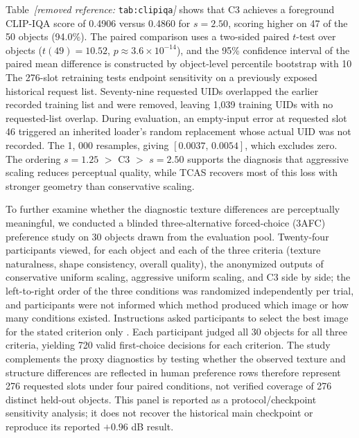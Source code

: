 \documentclass[times,twocolumn,final]{elsarticle}
\providecommand{\DIFadd}[1]{{\protect\color{blue} \sf #1}} %
\providecommand{\DIFdel}[1]{{\protect\color{red} \scriptsize #1}} %
\providecommand{\DIFaddbegin}{} %
\providecommand{\DIFaddend}{} %
\providecommand{\DIFdelbegin}{} %
\providecommand{\DIFdelend}{} %
\begin{document}
\DIFdelbegin \DIFdel{Table~\textit{[removed reference: }\texttt{tab:clipiqa}\textit{]} shows that C3 achieves a foreground CLIP-IQA score of 0.4906 versus 0.4860 for $s = 2.50$, scoring higher on 47 of the 50 objects (94.0\%). The paired comparison uses a two-sided paired $t$-test over objects ($t(49)=10.52$, $p\approx3.6\times10^{-14}$), and the 95\% confidence interval of the paired mean difference is constructed by object-level percentile bootstrap with 10}%
\DIFdelend \DIFaddbegin \DIFadd{The 276-slot retraining tests endpoint sensitivity on a previously exposed historical request list. Seventy-nine requested UIDs overlapped the earlier recorded training list and were removed, leaving 1,039 training UIDs with no requested-list overlap. During evaluation, an empty-input error at requested slot 46 triggered an inherited loader's random replacement whose actual UID was not recorded. The 1}\DIFaddend ,\DIFdelbegin %
\DIFdel{000 resamples, giving $[0.0037,\,0.0054]$, which excludes zero. The ordering $s = 1.25$ $>$ C3 $>$ $s = 2.50$ supports the diagnosis that aggressive scaling reduces perceptual quality, while TCAS recovers most of this loss with stronger geometry than conservative scaling.
}%

\DIFdel{To further examine whether the diagnostic texture differences are perceptually meaningful, we conducted a blinded three-alternative forced-choice (3AFC) preference study on 30 objects drawn from the evaluation pool. Twenty-four participants viewed, for each object and each of the three criteria (texture naturalness, shape consistency, overall quality), the anonymized outputs of conservative uniform scaling, aggressive uniform scaling, and C3 side by side; the left-to-right order of the three conditions was randomized independently per trial, and participants were not informed which method produced which image or how many conditions existed. Instructions asked participants to select the best image for the stated criterion only . Each participant judged all 30 objects for all three criteria, yielding 720 valid first-choice decisions for each criterion. The study complements the proxy diagnostics by testing whether the observed texture and structure differences are reflected in human preference}\DIFdelend \DIFaddbegin \DIFadd{104 rows therefore represent 276 requested slots under four paired conditions, not verified coverage of 276 distinct held-out objects. This panel is reported as a protocol/checkpoint sensitivity analysis; it does not recover the historical main checkpoint or reproduce its reported $+0.96$ dB result}\DIFaddend .
\end{document}
